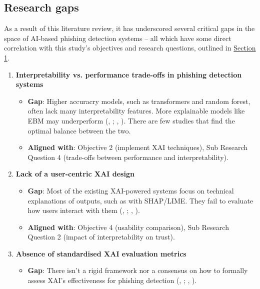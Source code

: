 
\subsection*{Research gaps}

As a result of this literature review, it has underscored several critical gaps in the space of AI-based phishing detection systems -- all which have some direct correlation with this study's objectives and research questions, outlined in \hyperref[sec:1-introduction]{Section 1}.

\begin{enumerate}
  \item \textbf{Interpretability vs. performance trade-offs in phishing detection systems}
  \begin{itemize}
    \item \textbf{Gap}: Higher accuracry models, such as transformers and random forest, often lack many interpretability features. More explainable models like EBM may underperform (\citeauthor{do2024integrated}, \citeyear{do2024integrated}; \citeauthor{greco2023explaining}, \citeyear{greco2023explaining}). There are few studies that find the optimal balance between the two.
    \item \textbf{Aligned with}: Objective 2 (implement XAI techniques), Sub Research Question 4 (trade-offs between performance and interpretability).
  \end{itemize}
  \item \textbf{Lack of a user-centric XAI design}
  \begin{itemize}
    \item \textbf{Gap}: Most of the existing XAI-powered systems focus on technical explanations of outputs, such as with SHAP/LIME. They fail to evaluate how users interact with them (\citeauthor{vo2024securing}, \citeyear{vo2024securing}; \citeauthor{anderson2015polymorphic}, \citeyear{anderson2015polymorphic}).
    \item \textbf{Aligned with}: Objective 4 (usability comparison), Sub Research Question 2 (impact of interpretability on trust).
  \end{itemize}
  \item \textbf{Absence of standardised XAI evaluation metrics}  \begin{itemize}
      \item \textbf{Gap}: There isn't a rigid framework nor a consensus on how to formally assess XAI's effectiveness for phishing detection (\citeauthor{reddy2023explainable}, \citeyear{reddy2023explainable}; \citeauthor{shendkar2024enhancing}, \citeyear{shendkar2024enhancing}).

\end{itemize}
\end{enumerate}
